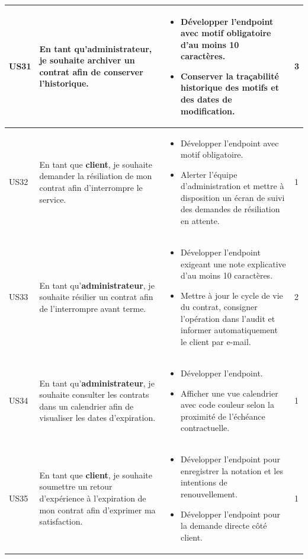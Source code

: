 \begin{longtable}{|C{1cm}|L{5.6cm}|L{8cm}|C{0.85cm}|}
US31 & En tant qu'\textbf{administrateur}, je souhaite archiver un contrat afin de conserver l'historique. &
\begin{itemize}[nosep, left=0pt, label={$\bullet$}]
\item Développer l'endpoint avec motif obligatoire d'au moins 10 caractères.
\item Conserver la traçabilité historique des motifs et des dates de modification.
\end{itemize} & 3 \\
\hline

US32 & En tant que \textbf{client}, je souhaite demander la résiliation de mon contrat afin d'interrompre le service. &
\begin{itemize}[nosep, left=0pt, label={$\bullet$}]
\item Développer l'endpoint avec motif obligatoire.
\item Alerter l'équipe d'administration et mettre à disposition un écran de suivi des demandes de résiliation en attente.
\end{itemize} & 1 \\
\hline

US33 & En tant qu'\textbf{administrateur}, je souhaite résilier un contrat afin de l'interrompre avant terme. &
\begin{itemize}[nosep, left=0pt, label={$\bullet$}]
\item Développer l'endpoint exigeant une note explicative d'au moins 10 caractères.
\item Mettre à jour le cycle de vie du contrat, consigner l'opération dans l'audit et informer automatiquement le client par e-mail.
\end{itemize} & 2 \\
\hline

US34 & En tant qu'\textbf{administrateur}, je souhaite consulter les contrats dans un calendrier afin de visualiser les dates d'expiration. &
\begin{itemize}[nosep, left=0pt, label={$\bullet$}]
\item Développer l'endpoint.
\item Afficher une vue calendrier avec code couleur selon la proximité de l'échéance contractuelle.
\end{itemize} & 1 \\
\hline

US35 & En tant que \textbf{client}, je souhaite soumettre un retour d'expérience à l'expiration de mon contrat afin d'exprimer ma satisfaction. &
\begin{itemize}[nosep, left=0pt, label={$\bullet$}]
\item Développer l'endpoint pour enregistrer la notation et les intentions de renouvellement.
\item Développer l'endpoint pour la demande directe côté client.
\end{itemize} & 1 \\
\hline


\end{longtable}
